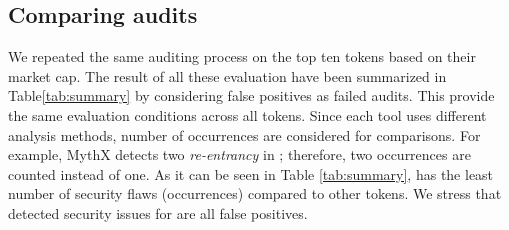 
\subsection{Comparing audits}
We repeated the same auditing process on the top ten tokens based on their market cap\cite{EtherScan}. The result of all these evaluation have been summarized in Table\ref{tab:summary} by considering false positives as failed audits. This provide the same evaluation conditions across all tokens. Since each tool uses different analysis methods, number of occurrences are considered for comparisons. For example, MythX detects two \textit{re-entrancy} in \sys; therefore, two occurrences are counted instead of one. As it can be seen in Table \ref{tab:summary}, \sys has the least number of security flaws (occurrences) compared to other tokens. We stress that detected security issues for \sys are all false positives.



